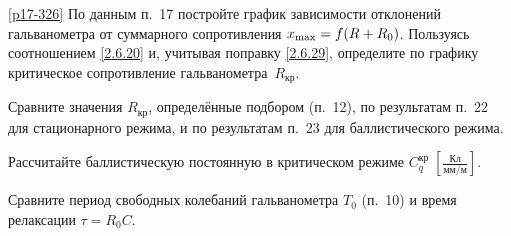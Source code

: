 \begin{lab:task}
%
%

	\item \ref{p17-326} По данным п.~17 постройте график зависимости 
    отклонений гальванометра от суммарного сопротивления $x_{\rm max}=f(R + R_0)$. 
    Пользуясь соотношением \eqref{2.6.20} и, учитывая поправку
    \eqref{2.6.29}, определите по графику критическое сопротивление 
    гальванометра~$R_{кр}$.

	\item Сравните значения $R_{\text{кр}}$, определённые подбором (п.~12),
     по результатам п.~22 для стационарного режима, и по результатам 
     п.~23 для баллистического режима.

	\item Рассчитайте баллистическую постоянную в критическом режиме 
    $C_{q}^{\text{кр}}\;\left[\frac{Кл}{мм/м}\right]$.

	\item Сравните период свободных колебаний гальванометра $T_0$ (п.~10) 
    и время релаксации $\tau = R_0 C$.
\end{lab:task}


